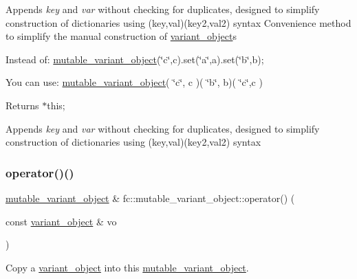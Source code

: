 Appends {\itshape key} and {\itshape var} without checking for duplicates, designed to simplify construction of dictionaries using (key,val)(key2,val2) syntax Convenience method to simplify the manual construction of \mbox{\hyperlink{classfc_1_1variant__object}{variant\+\_\+object}}\textquotesingle{}s

Instead of\+: {\ttfamily \mbox{\hyperlink{classfc_1_1mutable__variant__object}{mutable\+\_\+variant\+\_\+object}}(\char`\"{}c\char`\"{},c).set(\char`\"{}a\char`\"{},a).set(\char`\"{}b\char`\"{},b);}

You can use\+: {\ttfamily \mbox{\hyperlink{classfc_1_1mutable__variant__object}{mutable\+\_\+variant\+\_\+object}}( \char`\"{}c\char`\"{}, c )( \char`\"{}b\char`\"{}, b)( \char`\"{}c\char`\"{},c )}

\begin{DoxyReturn}{Returns}
$\ast$this;
\end{DoxyReturn}
Appends {\itshape key} and {\itshape var} without checking for duplicates, designed to simplify construction of dictionaries using (key,val)(key2,val2) syntax \mbox{\label{classfc_1_1mutable__variant__object_a4a6abfc7da25a302390f940f58154ff3}} 
\subsubsection{\texorpdfstring{operator()()}{operator()()}\hspace{0.1cm}{\footnotesize\ttfamily [2/3]}}
{\footnotesize\ttfamily \mbox{\hyperlink{classfc_1_1mutable__variant__object}{mutable\+\_\+variant\+\_\+object}} \& fc\+::mutable\+\_\+variant\+\_\+object\+::operator() (\begin{DoxyParamCaption}\item[{const \mbox{\hyperlink{classfc_1_1variant__object}{variant\+\_\+object}} \&}]{vo }\end{DoxyParamCaption})}

Copy a \mbox{\hyperlink{classfc_1_1variant__object}{variant\+\_\+object}} into this \mbox{\hyperlink{classfc_1_1mutable__variant__object}{mutable\+\_\+variant\+\_\+object}}. \mbox{\label{classfc_1_1mutable__variant__object_a030da450c7e13f703aec3fd9b32a9ea0}} 
